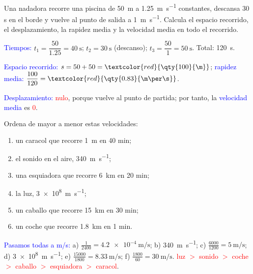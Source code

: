 \begin{center}
\end{center}

\begin{example}
    Una nadadora recorre una piscina de \qty{50}{\m} a \qty{1.25}{\m\per\s} constantes, descansa 30 s en el borde y vuelve al punto de salida a \qty{1}{\m\per\s}. Calcula el espacio recorrido, el desplazamiento, la rapidez media y la velocidad media en todo el recorrido.

    \textcolor{blue}{Tiempos:} \(t_1 = \dfrac{50}{\num{1.25}} = \qty{40}{\s}\); \(t_2 = \qty{30}{\s}\) (descanso); \(t_3 = \dfrac{50}{1} = \qty{50}{\s}\). Total: \qty{120}{\s}.

    \textcolor{blue}{Espacio recorrido:} \(s = 50 + 50 = \textcolor{red}{\qty{100}{\m}}\); \textcolor{blue}{rapidez media:} \(\dfrac{100}{120} = \textcolor{red}{\qty{0.83}{\m\per\s}}\).

    \textcolor{blue}{Desplazamiento:} \textcolor{red}{nulo}, porque vuelve al punto de partida; por tanto, la \textcolor{blue}{velocidad media} es \textcolor{red}{0}.
\end{example}

\begin{exercise}
    Ordena de mayor a menor estas velocidades:
    \begin{enumerate}[label=\alph*)]
        \item un caracol que recorre \qty{1}{\m} en 40 min;
        \item el sonido en el aire, \qty{340}{\m\per\s};
        \item una esquiadora que recorre \qty{6}{\km} en 20 min;
        \item la luz, \qty{3e8}{\m\per\s};
        \item un caballo que recorre \qty{15}{\km} en 30 min;
        \item un coche que recorre \qty{1.8}{\km} en 1 min.
    \end{enumerate}
    \begin{solu}
        \textcolor{blue}{Pasamos todas a m/s:} a) \(\frac{1}{2400} = \qty{4.2e-4}{\m\per\s}\); b) \qty{340}{\m\per\s}; c) \(\frac{6000}{1200} = \qty{5}{\m\per\s}\); d) \qty{3e8}{\m\per\s}; e) \(\frac{15000}{1800} = \qty{8.33}{\m\per\s}\); f) \(\frac{1800}{60} = \qty{30}{\m\per\s}\).
        \textcolor{red}{luz \(>\) sonido \(>\) coche \(>\) caballo \(>\) esquiadora \(>\) caracol}.
    \end{solu}
\end{exercise}


